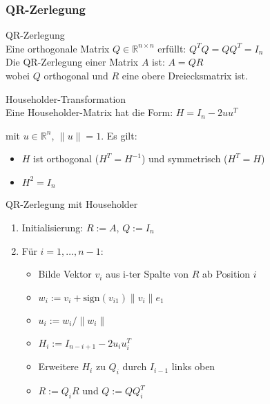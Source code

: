 \columnbreak

\subsubsection{QR-Zerlegung}

\begin{concept}{QR-Zerlegung}\\
Eine orthogonale Matrix $Q \in \mathbb{R}^{n\times n}$ erfüllt: $Q^T Q = QQ^T = I_n$
\vspace{1mm}\\
Die QR-Zerlegung einer Matrix $A$ ist: $A = QR$
\vspace{1mm}\\
wobei $Q$ orthogonal und $R$ eine obere Dreiecksmatrix ist.
\end{concept}

\begin{definition}{Householder-Transformation}\\
Eine Householder-Matrix hat die Form:
$H = I_n - 2uu^T$

mit $u \in \mathbb{R}^n$, $\|u\| = 1$. Es gilt:
\begin{itemize}
    \item $H$ ist orthogonal ($H^T = H^{-1}$) und symmetrisch ($H^T = H$)
    \item $H^2 = I_n$
\end{itemize}
\end{definition}

\begin{KR}{QR-Zerlegung mit Householder}
\begin{enumerate}
    \item Initialisierung: $R := A$, $Q := I_n$
    \item Für $i = 1,\ldots,n-1$:
        \begin{itemize}
            \item Bilde Vektor $v_i$ aus i-ter Spalte von $R$ ab Position $i$
            \item $w_i := v_i + \text{sign}(v_{i1})\|v_i\|e_1$
            \item $u_i := w_i/\|w_i\|$
            \item $H_i := I_{n-i+1} - 2u_iu_i^T$
            \item Erweitere $H_i$ zu $Q_i$ durch $I_{i-1}$ links oben
            \item $R := Q_iR$ und $Q := QQ_i^T$
        \end{itemize}
\end{enumerate}
\end{KR}

